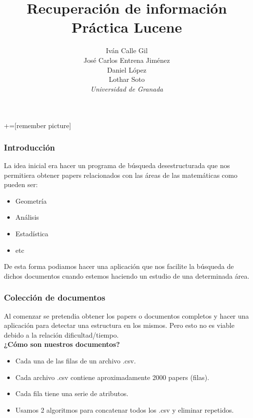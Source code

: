 \documentclass{beamer} %
\author{Iván Calle Gil\\ José Carlos Entrena Jiménez\\ Daniel López\\ Lothar Soto\\\textit{Universidad de Granada}}
\title{Recuperación de información \\Práctica Lucene}
\begin{document}
+=[remember picture]

\everymath{\displaystyle}

\begin{frame}
\titlepage
\end{frame}

\begin{frame}
\frametitle{Introducción}
La idea inicial era hacer un programa de búsqueda desestructurada que nos permitiera obtener papers relacionados con las áreas de las matemáticas como pueden ser:
\begin{itemize}
	\item Geometría
	\item Análisis
	\item Estadística
	\item etc
\end{itemize}
De esta forma podiamos hacer una aplicación que nos facilite la búsqueda de dichos documentos cuando estemos haciendo un estudio de una determinada área.

\end{frame}

\begin{frame}
\frametitle{Colección de documentos}
Al comenzar se pretendia obtener los papers o documentos completos y hacer una aplicación para detectar una estructura en los mismos. Pero esto no es viable debido a la relación dificultad/tiempo.\\
\textbf{¿Cómo son nuestros documentos?}
\begin{itemize}
	\item Cada una de las filas de un archivo .csv.
	\item Cada archivo .csv contiene aproximadamente 2000 papers (filas).
	\item Cada fila tiene una serie de atributos.
	\item Usamos 2 algoritmos para concatenar todos los .csv y eliminar repetidos.
\end{itemize}
\end{frame}
\end{document}
